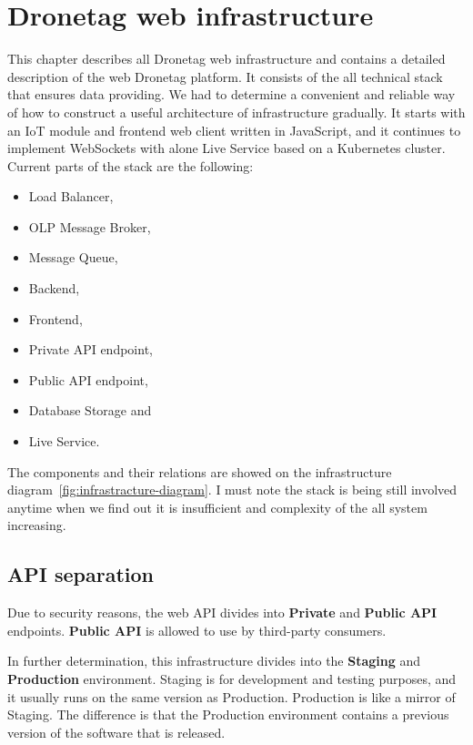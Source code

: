 \chapter{Dronetag web infrastructure}\label{ch:dronetag-web-infrastructure}
This chapter describes all Dronetag web infrastructure and contains a detailed description of the web Dronetag platform.
It consists of the all technical stack that ensures data providing.
We had to determine a convenient and reliable way of how to construct a useful architecture of infrastructure gradually.
It starts with an IoT module and frontend web client written in JavaScript, and it continues to implement WebSockets with alone Live Service based on a Kubernetes cluster.
Current parts of the stack are the following:
\begin{itemize}
    \item Load Balancer,
    \item OLP Message Broker,
    \item Message Queue,
    \item Backend,
    \item Frontend,
    \item Private API endpoint,
    \item Public API endpoint,
    \item Database Storage and
    \item Live Service.
\end{itemize}
The components and their relations are showed on the infrastructure diagram~\ref{fig:infrastracture-diagram}.
I must note the stack is being still involved anytime when we find out it is insufficient and complexity of the all system increasing.

\section{API separation}\label{sec:api-separation}
Due to security reasons, the web API divides into \textbf{Private} and \textbf{Public API} endpoints.
\textbf{Public API} is allowed to use by third-party consumers.

In further determination, this infrastructure divides into the \textbf{Staging} and \textbf{Production} environment.
Staging is for development and testing purposes, and it usually runs on the same version as Production.
Production is like a mirror of Staging.
The difference is that the Production environment contains a previous version of the software that is released.



